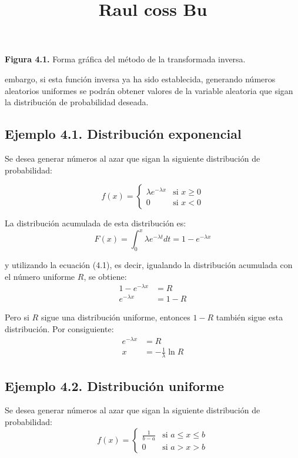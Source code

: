 \documentclass{article}
\title{Raul coss Bu}
\begin{document}
\textbf{Figura 4.1.} Forma gráfica del método de la transformada inversa.

embargo, si esta función inversa ya ha sido establecida, generando números aleatorios uniformes se podrán obtener valores de la variable aleatoria que sigan la distribución de probabilidad deseada.

\subsection*{Ejemplo 4.1. Distribución exponencial}

Se desea generar números al azar que sigan la siguiente distribución de probabilidad:

\begin{equation}
f(x) = \begin{cases}
\lambda e^{-\lambda x} & \text{si } x \geq 0 \\
0 & \text{si } x < 0
\end{cases} \tag{4.2}
\end{equation}

La distribución acumulada de esta distribución es:
\begin{equation*}
F(x) = \int_{0}^{x} \lambda e^{-\lambda t} dt = 1 - e^{-\lambda x}
\end{equation*}

y utilizando la ecuación (4.1), es decir, igualando la distribución acumulada con el número uniforme $R$, se obtiene:
\begin{align*}
1 - e^{-\lambda x} &= R \\
e^{-\lambda x} &= 1 - R
\end{align*}

Pero si $R$ sigue una distribución uniforme, entonces $1 - R$ también sigue esta distribución. Por consiguiente:
\begin{align}
e^{-\lambda x} &= R \nonumber \\
x &= -\frac{1}{\lambda} \ln R \tag{4.3}
\end{align}

\subsection*{Ejemplo 4.2. Distribución uniforme}

Se desea generar números al azar que sigan la siguiente distribución de probabilidad:
\begin{equation}
f(x) = \begin{cases}
\frac{1}{b-a} & \text{si } a \leq x \leq b \\
0 & \text{si } a > x > b
\end{cases} \tag{4.4}
\end{equation}
\end{document}
